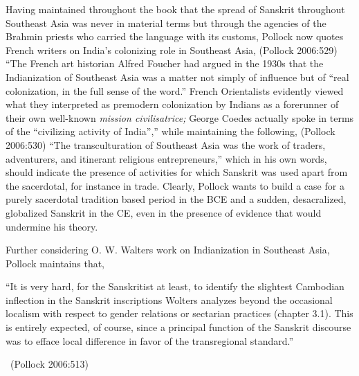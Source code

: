 Having maintained throughout the book that the spread of Sanskrit throughout Southeast Asia was never in material terms but through the agencies of the Brahmin priests who carried the language with its customs, Pollock now quotes French writers on India’s colonizing role in Southeast Asia, (Pollock 2006:529) “The French art historian Alfred Foucher had argued in the 1930s that the Indianization of Southeast Asia was a matter not simply of influence but of “real colonization, in the full sense of the word.” French Orientalists evidently viewed what they interpreted as premodern colonization by Indians as a forerunner of their own well-known \textit{mission civilisatrice;} George Coedes actually spoke in terms of the “civilizing activity of India”,” while maintaining the following, (Pollock 2006:530) “The transculturation of Southeast Asia was the work of traders, adventurers, and itinerant religious entrepreneurs,” which in his own words, should indicate the presence of activities for which Sanskrit was used apart from the sacerdotal, for instance in trade. Clearly, Pollock wants to build a case for a purely sacerdotal tradition based period in the BCE and a sudden, desacralized, globalized Sanskrit in the CE, even in the presence of evidence that would undermine his theory.

Further considering O. W. Walters work on Indianization in Southeast Asia, Pollock maintains that,

\begin{myquote}
“It is very hard, for the Sanskritist at least, to identify the slightest Cambodian inflection in the Sanskrit inscriptions Wolters analyzes beyond the occasional localism with respect to gender relations or sectarian practices (chapter 3.1). This is entirely expected, of course, since a principal function of the Sanskrit discourse was to efface local difference in favor of the transregional standard.” 

~\hfill (Pollock 2006:513)
\end{myquote}

